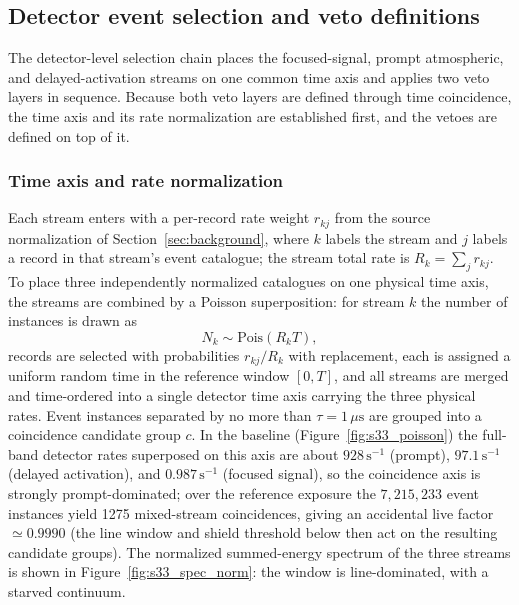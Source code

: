 \documentclass[11pt]{article}
\begin{document}
\subsection{Detector event selection and veto definitions}
\label{sec:selection}

The detector-level selection chain places the focused-signal, prompt
atmospheric, and delayed-activation streams on one common time axis and applies
two veto layers in sequence. Because both veto layers are defined through time
coincidence, the time axis and its rate normalization are established first, and
the vetoes are defined on top of it.

\subsubsection{Time axis and rate normalization}

Each stream enters with a per-record rate weight $r_{kj}$ from the source
normalization of Section~\ref{sec:background}, where $k$ labels the stream and
$j$ labels a record in that stream's event catalogue; the stream total rate is
$R_k=\sum_j r_{kj}$. To place three independently normalized catalogues on one
physical time axis, the streams are combined by a Poisson superposition: for
stream $k$ the number of instances is drawn as
\begin{equation}
  N_k\sim \mathrm{Pois}(R_k T),
\end{equation}
records are selected with probabilities $r_{kj}/R_k$ with replacement, each is
assigned a uniform random time in the reference window $[0,T]$, and all streams
are merged and time-ordered into a single detector time axis carrying the three
physical rates. Event instances separated by no more than $\tau=1\,\mu\mathrm{s}$
are grouped into a coincidence candidate group $c$. In the baseline (Figure~\ref{fig:s33_poisson}) the full-band detector rates superposed on this axis are about $928\,\mathrm{s^{-1}}$ (prompt), $97.1\,\mathrm{s^{-1}}$ (delayed activation), and $0.987\,\mathrm{s^{-1}}$ (focused signal), so the coincidence axis is strongly prompt-dominated; over the reference exposure the $7{,}215{,}233$ event instances yield 1275 mixed-stream coincidences, giving an accidental live factor $\simeq0.9990$ (the line window and shield threshold below then act on the resulting candidate groups). The normalized summed-energy spectrum of the three streams is shown in Figure~\ref{fig:s33_spec_norm}: the window is line-dominated, with a starved continuum.
\end{document}
